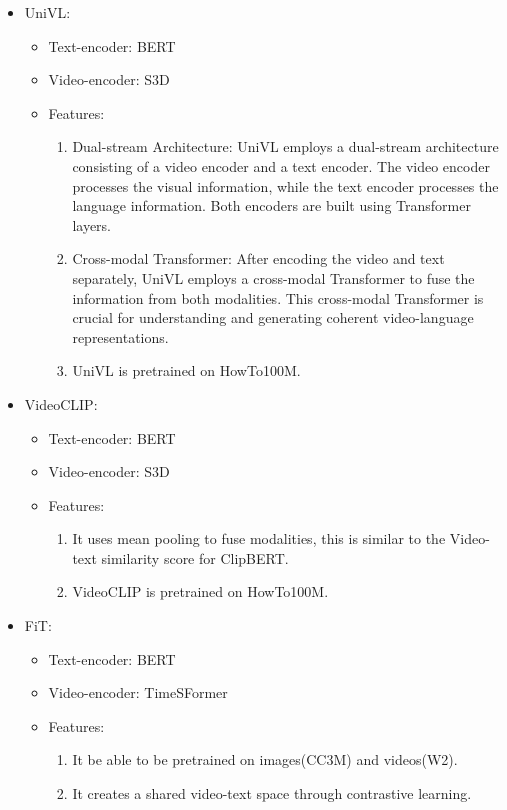 \begin{itemize}
\item UniVL:
\begin{itemize}
\item Text-encoder: BERT
\item Video-encoder: S3D
\item Features:
\begin{enumerate}
\item Dual-stream Architecture: UniVL employs a dual-stream architecture consisting of a video encoder and a text encoder. The video encoder processes the visual information, while the text encoder processes the language information. Both encoders are built using Transformer layers.
\item Cross-modal Transformer: After encoding the video and text separately, UniVL employs a cross-modal Transformer to fuse the information from both modalities. This cross-modal Transformer is crucial for understanding and generating coherent video-language representations.
\item UniVL is pretrained on HowTo100M.
\end{enumerate}
\end{itemize}
\end{itemize}

\begin{itemize}
\item VideoCLIP:
\begin{itemize}
\item Text-encoder: BERT
\item Video-encoder: S3D
\item Features:
\begin{enumerate}
\item It uses mean pooling to fuse modalities, this is similar to the Video-text similarity score for ClipBERT.
\item VideoCLIP is pretrained on HowTo100M.
\end{enumerate}
\end{itemize}
\end{itemize}

\begin{itemize}
\item FiT:
\begin{itemize}
\item Text-encoder: BERT
\item Video-encoder: TimeSFormer
\item Features:
\begin{enumerate}
\item It be able to be pretrained on images(CC3M) and videos(W2).
\item It creates a shared video-text space through contrastive learning. 
\end{enumerate}
\end{itemize}
\end{itemize}

